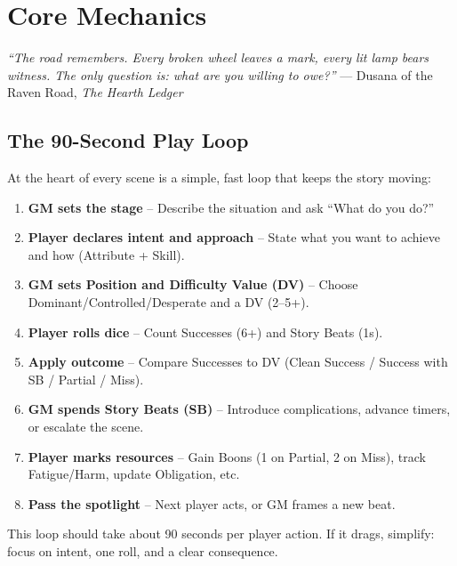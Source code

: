 \chapter{Core Mechanics}
\label{ch:core-mechanics}

\begin{tcolorbox}[colback=black!3!white,colframe=black!40!white,title=\textit{A Word from the Raven Road},breakable]
\emph{``The road remembers. Every broken wheel leaves a mark, every lit lamp bears witness. The only question is: what are you willing to owe?''}  
\vspace{0.2cm}\hfill --- Dusana of the Raven Road, \textit{The Hearth Ledger}
\end{tcolorbox}

\section{The 90-Second Play Loop}
\label{sec:play-loop}

At the heart of every scene is a simple, fast loop that keeps the story moving:

\begin{enumerate}
  \item \textbf{GM sets the stage} -- Describe the situation and ask ``What do you do?''
  \item \textbf{Player declares intent and approach} -- State what you want to achieve and how (Attribute + Skill).
  \item \textbf{GM sets Position and Difficulty Value (DV)} -- Choose Dominant/Controlled/Desperate and a DV (2--5+).
  \item \textbf{Player rolls dice} -- Count Successes (6+) and Story Beats (1s).
  \item \textbf{Apply outcome} -- Compare Successes to DV (Clean Success / Success with SB / Partial / Miss).
  \item \textbf{GM spends Story Beats (SB)} -- Introduce complications, advance timers, or escalate the scene.
  \item \textbf{Player marks resources} -- Gain Boons (1 on Partial, 2 on Miss), track Fatigue/Harm, update Obligation, etc.
  \item \textbf{Pass the spotlight} -- Next player acts, or GM frames a new beat.
\end{enumerate}

\noindent This loop should take about 90 seconds per player action. If it drags, simplify: focus on intent, one roll, and a clear consequence.

